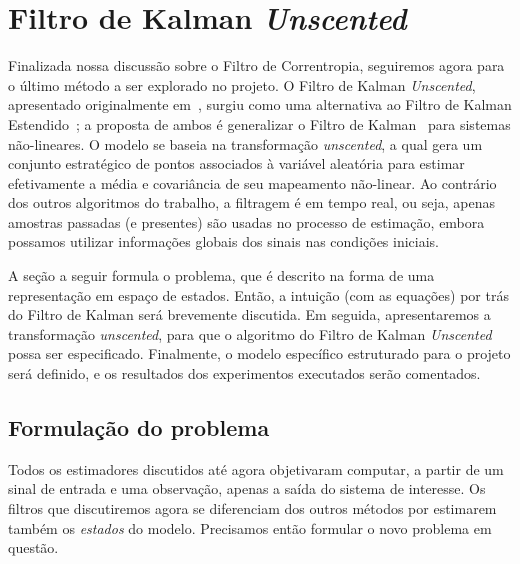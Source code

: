 \chapter{Filtro de Kalman \textit{Unscented}}
\label{chapter:unscented}

Finalizada nossa discussão sobre o Filtro de Correntropia, seguiremos agora para o
último método a ser explorado no projeto. O Filtro de Kalman \textit{Unscented},
apresentado originalmente em~\cite{julier-1997}, surgiu como uma alternativa ao Filtro
de Kalman Estendido~\cite{sorenson-1985}; a proposta de ambos é generalizar o Filtro de
Kalman~\cite{hayes-1996} para sistemas não-lineares. O modelo se baseia na
transformação \textit{unscented}, a qual gera um conjunto estratégico de pontos
associados à variável aleatória para estimar efetivamente a média e covariância de seu
mapeamento não-linear. Ao contrário dos outros algoritmos do trabalho, a filtragem é em
tempo real, ou seja, apenas amostras passadas (e presentes) são usadas no processo de
estimação, embora possamos utilizar informações globais dos sinais nas condições
iniciais.

A seção a seguir formula o problema, que é descrito na forma de uma representação em
espaço de estados. Então, a intuição (com as equações) por trás do Filtro de Kalman
será brevemente discutida. Em seguida, apresentaremos a transformação
\textit{unscented}, para que o algoritmo do Filtro de Kalman \textit{Unscented} possa
ser especificado. Finalmente, o modelo específico estruturado para o projeto será
definido, e os resultados dos experimentos executados serão comentados.

\section{Formulação do problema}
\label{section:unscented:formulation}

Todos os estimadores discutidos até agora objetivaram computar, a partir de um sinal de
entrada e uma observação, apenas a saída do sistema de interesse. Os filtros que
discutiremos agora se diferenciam dos outros métodos por estimarem também os
\emph{estados} do modelo. Precisamos então formular o novo problema em questão.

